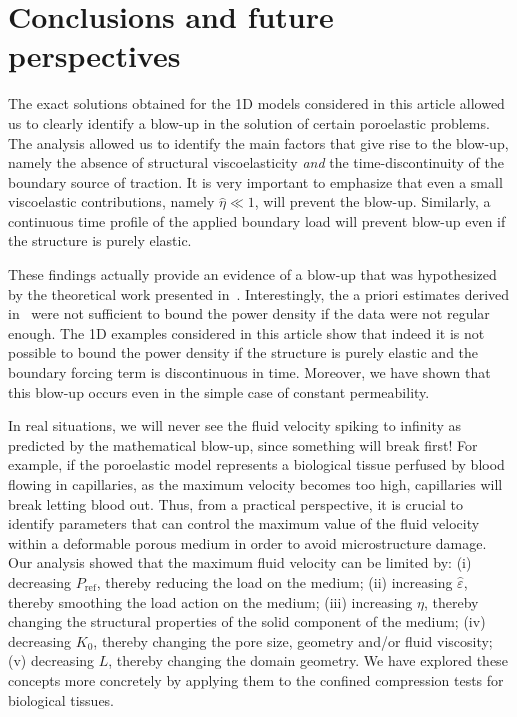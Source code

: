 \documentclass[12pt,a4paper]{amsart}
\theoremstyle{definition}
\newcommand{\heta}{\hat{\eta}}
\begin{document}
\section{Conclusions and future perspectives}\label{sec:conclusions}

The exact solutions obtained for the 1D models considered in this article allowed us to clearly identify a blow-up in the solution of certain poroelastic problems. The analysis allowed us to identify the main factors that give rise to the blow-up, namely the absence of structural viscoelasticity \textit{and} the time-discontinuity of the boundary source of traction. It is very important to emphasize that even a small viscoelastic contributions, namely $\heta\ll 1$, will prevent the blow-up. Similarly, a continuous time profile of the applied boundary load will prevent blow-up even if the structure is purely elastic.

These findings actually provide an evidence of a blow-up that was hypothesized by the theoretical work presented in~\cite{ARMA}. Interestingly, the a priori estimates derived in~\cite{ARMA} were not sufficient to bound the power density if the data were not regular enough. The 1D examples considered in this article show that indeed it is not possible to bound the power density if the structure is purely elastic and the boundary forcing term is discontinuous in time. Moreover, we have shown that this blow-up occurs even in the simple case of constant permeability.

In real situations, we will never see the fluid velocity spiking to infinity as predicted by the mathematical blow-up, since something will break first! For example, if the poroelastic model represents a biological tissue perfused by blood flowing in capillaries, as the maximum velocity becomes too high, capillaries will break letting blood out. Thus, from a practical perspective, it is crucial to identify parameters that can control the maximum value of the fluid velocity within a deformable porous medium in order to avoid microstructure damage. Our analysis showed that the maximum fluid velocity can be limited by:
(i) decreasing $P_{\text{ref}}$, thereby reducing the load on the medium;
(ii) increasing $\hat{\varepsilon}$, thereby smoothing the load action on the medium;
(iii) increasing $\eta$, thereby changing the structural properties of the solid component of the medium;
(iv) decreasing $K_0$, thereby changing the pore size, geometry and/or fluid viscosity;
(v) decreasing $L$, thereby changing the domain geometry. We have explored these concepts more concretely by applying them to the confined compression tests for biological tissues.
\end{document}
